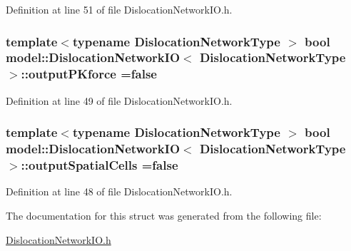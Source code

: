 Definition at line 51 of file Dislocation\+Network\+I\+O.\+h.

\hypertarget{structmodel_1_1_dislocation_network_i_o_a918487adc6dd968a538aaf640e43dec3}{}
\subsubsection[{output\+P\+Kforce}]{\setlength{\rightskip}{0pt plus 5cm}template$<$typename Dislocation\+Network\+Type $>$ bool {\bf model\+::\+Dislocation\+Network\+I\+O}$<$ Dislocation\+Network\+Type $>$\+::output\+P\+Kforce =false\hspace{0.3cm}{\ttfamily [static]}}\label{structmodel_1_1_dislocation_network_i_o_a918487adc6dd968a538aaf640e43dec3}


Definition at line 49 of file Dislocation\+Network\+I\+O.\+h.

\hypertarget{structmodel_1_1_dislocation_network_i_o_ae73e971a9665d4cd5d0e4765ab6eeeb2}{}
\subsubsection[{output\+Spatial\+Cells}]{\setlength{\rightskip}{0pt plus 5cm}template$<$typename Dislocation\+Network\+Type $>$ bool {\bf model\+::\+Dislocation\+Network\+I\+O}$<$ Dislocation\+Network\+Type $>$\+::output\+Spatial\+Cells =false\hspace{0.3cm}{\ttfamily [static]}}\label{structmodel_1_1_dislocation_network_i_o_ae73e971a9665d4cd5d0e4765ab6eeeb2}


Definition at line 48 of file Dislocation\+Network\+I\+O.\+h.



The documentation for this struct was generated from the following file\+:\begin{DoxyCompactItemize}
\item 
\hyperlink{_dislocation_network_i_o_8h}{Dislocation\+Network\+I\+O.\+h}\end{DoxyCompactItemize}
